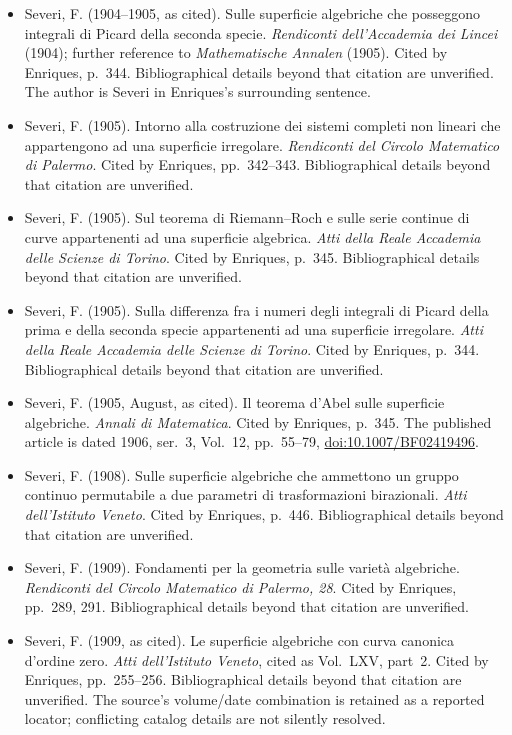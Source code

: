 \begin{sloppypar}
\begin{itemize}
\item Severi, F. (1904--1905, as cited). Sulle superficie algebriche che posseggono integrali di Picard della seconda specie. \emph{Rendiconti dell'Accademia dei Lincei} (1904); further reference to \emph{Mathematische Annalen} (1905). Cited by Enriques, p.~344. Bibliographical details beyond that citation are unverified. The author is Severi in Enriques's surrounding sentence.

\item Severi, F. (1905). Intorno alla costruzione dei sistemi completi non lineari che appartengono ad una superficie irregolare. \emph{Rendiconti del Circolo Matematico di Palermo}. Cited by Enriques, pp.~342--343. Bibliographical details beyond that citation are unverified.

\item Severi, F. (1905). Sul teorema di Riemann--Roch e sulle serie continue di curve appartenenti ad una superficie algebrica. \emph{Atti della Reale Accademia delle Scienze di Torino}. Cited by Enriques, p.~345. Bibliographical details beyond that citation are unverified.

\item Severi, F. (1905). Sulla differenza fra i numeri degli integrali di Picard della prima e della seconda specie appartenenti ad una superficie irregolare. \emph{Atti della Reale Accademia delle Scienze di Torino}. Cited by Enriques, p.~344. Bibliographical details beyond that citation are unverified.

\item Severi, F. (1905, August, as cited). Il teorema d'Abel sulle superficie algebriche. \emph{Annali di Matematica}. Cited by Enriques, p.~345. The published article is dated 1906, ser.~3, Vol.~12, pp.~55--79, \href{https://doi.org/10.1007/BF02419496}{doi:10.1007/BF02419496}.

\item Severi, F. (1908). Sulle superficie algebriche che ammettono un gruppo continuo permutabile a due parametri di trasformazioni birazionali. \emph{Atti dell'Istituto Veneto}. Cited by Enriques, p.~446. Bibliographical details beyond that citation are unverified.

\item Severi, F. (1909). Fondamenti per la geometria sulle varietà algebriche. \emph{Rendiconti del Circolo Matematico di Palermo, 28}. Cited by Enriques, pp.~289, 291. Bibliographical details beyond that citation are unverified.

\item Severi, F. (1909, as cited). Le superficie algebriche con curva canonica d'ordine zero. \emph{Atti dell'Istituto Veneto}, cited as Vol.~LXV, part~2. Cited by Enriques, pp.~255--256. Bibliographical details beyond that citation are unverified. The source's volume/date combination is retained as a reported locator; conflicting catalog details are not silently resolved.


\end{itemize}
\end{sloppypar}
